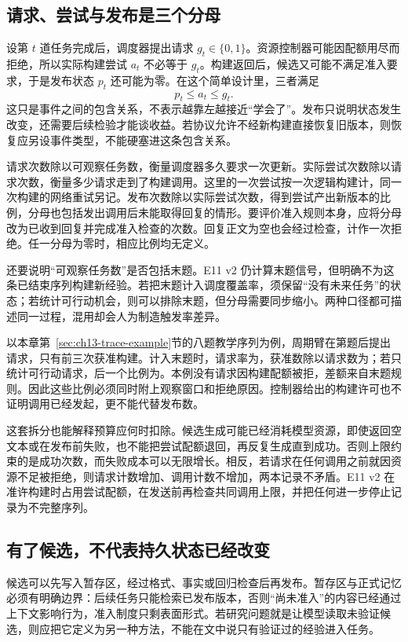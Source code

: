\subsection{请求、尝试与发布是三个分母}

设第 $t$ 道任务完成后，调度器提出请求 $g_t\in\{0,1\}$。资源控制器可能因配额用尽而拒绝，所以实际构建尝试 $a_t$ 不必等于 $g_t$。构建返回后，候选又可能不满足准入要求，于是发布状态 $p_t$ 还可能为零。在这个简单设计里，三者满足
\[
  p_t\le a_t\le g_t.
\]
这只是事件之间的包含关系，不表示越靠左越接近“学会了”。发布只说明状态发生改变，还需要后续检验才能谈收益。若协议允许不经新构建直接恢复旧版本，则恢复应另设事件类型，不能硬塞进这条包含关系。

请求次数除以可观察任务数，衡量调度器多久要求一次更新。实际尝试次数除以请求次数，衡量多少请求走到了构建调用。这里的一次尝试按一次逻辑构建计，同一次构建的网络重试另记。发布次数除以实际尝试次数，得到尝试产出新版本的比例，分母也包括发出调用后未能取得回复的情形。要评价准入规则本身，应将分母改为已收到回复并完成准入检查的次数。回复正文为空也会经过检查，计作一次拒绝。任一分母为零时，相应比例均无定义。

还要说明“可观察任务数”是否包括末题。E11 v2 仍计算末题信号，但明确不为这条已结束序列构建新经验。若把末题计入调度覆盖率，须保留“没有未来任务”的状态；若统计可行动机会，则可以排除末题，但分母需要同步缩小。两种口径都可描述同一过程，混用却会人为制造触发率差异。

以本章第~\ref{sec:ch13-trace-example}节的八题教学序列为例，周期臂在第题后提出请求，只有前三次获准构建。计入末题时，请求率为，获准数除以请求数为；若只统计可行动请求，后一个比例为。本例没有请求因构建配额被拒，差额来自末题规则。因此这些比例必须同时附上观察窗口和拒绝原因。控制器给出的构建许可也不证明调用已经发起，更不能代替发布数。

这套拆分也能解释预算应何时扣除。候选生成可能已经消耗模型资源，即使返回空文本或在发布前失败，也不能把尝试配额退回，再反复生成直到成功。否则上限约束的是成功次数，而失败成本可以无限增长。相反，若请求在任何调用之前就因资源不足被拒绝，则请求计数增加、调用计数不增加，两本记录不矛盾。E11 v2 在准许构建时占用尝试配额，在发送前再检查共同调用上限，并把任何进一步停止记录为不完整序列。

\subsection{有了候选，不代表持久状态已经改变}

候选可以先写入暂存区，经过格式、事实或回归检查后再发布。暂存区与正式记忆必须有明确边界：后续任务只能检索已发布版本，否则“尚未准入”的内容已经通过上下文影响行为，准入制度只剩表面形式。若研究问题就是让模型读取未验证候选，则应把它定义为另一种方法，不能在文中说只有验证过的经验进入任务。

